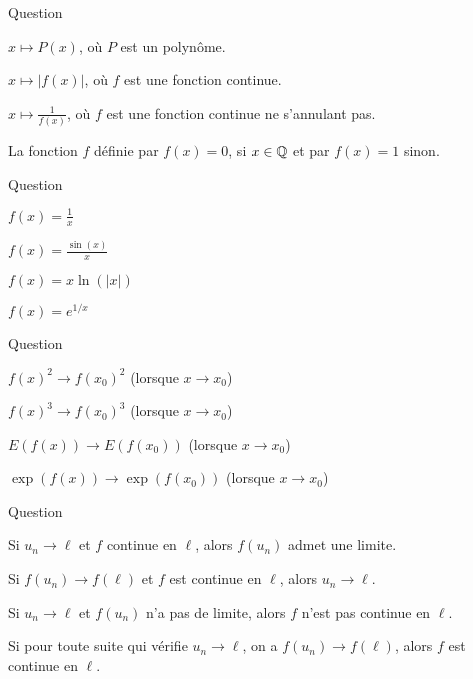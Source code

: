 \begin{multi}[multiple,feedback=
{La fonction \(f\) définie par \(f(x) = 0\), si \(x\in \Qq\) et par \(f(x)=1\) sinon, est une fonction qui n'est continue en aucun point \(x_0\in \Rr\) !
}]{Question}
    \item* \(x \mapsto P(x)\), où \(P\) est un polynôme.
    \item* \(x \mapsto |f(x)|\), où \(f\) est une fonction continue.
    \item* \(x \mapsto \frac{1}{f(x)}\), où \(f\) est une fonction continue ne s'annulant pas.
    \item La fonction \(f\) définie par \(f(x) = 0\), si \(x\in \Qq\) et par \(f(x)=1\) sinon.
\end{multi}


\begin{multi}[multiple,feedback=
{Toutes les fonctions sont  continues sur \(\Rr^*\), il s'agit donc de déterminer si \(f(x) \to 0\) lorsque \(x\to0\). C'est uniquement le cas de \(x \ln( |x|)\).
}]{Question}
    \item \(f(x) = \frac 1x\)
    \item \(f(x) = \frac{\sin(x)}{x}\)
    \item* \(f(x) = x \ln( |x|)\)
    \item \(f(x) = e^{1/x}\)
\end{multi}


\begin{multi}[multiple,feedback=
{Si \(f(x)^2 \to f(x_0)^2\)  alors ce n'est pas toujours vrai que \(f(x) \to f(x_0)\), prendre la fonction \(f(x)=-1\) si \(x<0\) et \(f(x)=+1\) sinon. Par contre avec le cube c'est vrai, car la fonction \(x \mapsto x^3\) est une bijection continue de \(\Rr\) dans \(\Rr\), idem avec l'exponentielle !
}]{Question}
    \item \(f(x)^2 \to f(x_0)^2\) (lorsque \(x \to x_0\))
    \item* \(f(x)^3 \to f(x_0)^3\) (lorsque \(x \to x_0\))
    \item \(E(f(x)) \to E(f(x_0))\) (lorsque \(x \to x_0\))
    \item* \(\exp(f(x)) \to \exp(f(x_0))\) (lorsque \(x \to x_0\))
\end{multi}


\begin{multi}[multiple,feedback=
{Une fonction \(f\) est continue en \(\ell\) si et seulement si 
pour toute suite \((u_n)\) qui tend vers \(\ell\), on a \(f(u_n) \to f(\ell)\).
}]{Question}
    \item* Si \(u_n \to \ell\) et \(f\) continue en \(\ell\), alors \(f(u_n)\) admet une limite.
    \item Si \(f(u_n) \to f(\ell)\) et \(f\) est continue en \(\ell\), alors \(u_n \to \ell\).
    \item* Si \(u_n \to \ell\) et \(f(u_n)\) n'a pas de limite, alors \(f\) n'est pas continue en \(\ell\).
    \item* Si pour toute suite qui vérifie \(u_n \to \ell\), on a \(f(u_n) \to f(\ell)\), alors \(f\) est continue en \(\ell\).
\end{multi}


